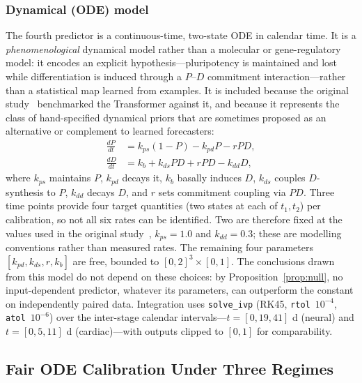 \documentclass[pdflatex,sn-mathphys-num]{sn-jnl}
\theoremstyle{thmstyleone}%
\theoremstyle{thmstyletwo}%
\theoremstyle{thmstylethree}%
\begin{document}
\subsubsection{Dynamical (ODE) model} The fourth predictor is a continuous-time, two-state ODE in calendar time. It is a \emph{phenomenological} dynamical model rather than a molecular or gene-regulatory model: it encodes an explicit hypothesis---pluripotency is maintained and lost while differentiation is induced through a $P$--$D$ commitment interaction---rather than a statistical map learned from examples. It is included because the original study~\cite{kanu2026transformer} benchmarked the Transformer against it, and because it represents the class of hand-specified dynamical priors that are sometimes proposed as an alternative or complement to learned forecasters:
\begin{align}
\frac{dP}{dt} &= k_{ps}(1-P) - k_{pd}P - rPD,
\label{eq:ode_p}\\
\frac{dD}{dt} &= k_b + k_{ds}PD + rPD - k_{dd}D,
\label{eq:ode_d}
\end{align}
where $k_{ps}$ maintains $P$, $k_{pd}$ decays it, $k_b$ basally induces $D$, $k_{ds}$ couples $D$-synthesis to $P$, $k_{dd}$ decays $D$, and $r$ sets commitment coupling via $PD$. Three time points provide four target quantities (two states at each of $t_1,t_2$) per calibration, so not all six rates can be identified. Two are therefore fixed at the values used in the original study~\cite{kanu2026transformer}, $k_{ps}{=}1.0$ and $k_{dd}{=}0.3$; these are modelling conventions rather than measured rates. The remaining four parameters $[k_{pd},k_{ds},r,k_b]$ are free, bounded to $[0,2]^3\times[0,1]$. The conclusions drawn from this model do not depend on these choices: by Proposition~\ref{prop:null}, no input-dependent predictor, whatever its parameters, can outperform the constant on independently paired data. Integration uses \texttt{solve\_ivp} (RK45, \texttt{rtol}~$10^{-4}$, \texttt{atol}~$10^{-6}$) over the inter-stage calendar intervals---$t=[0,19,41]$ d (neural) and $t=[0,5,11]$ d (cardiac)---with outputs clipped to $[0,1]$ for comparability.

\subsection{\textbf{Fair ODE Calibration Under Three Regimes}}
\label{subsec:ode_calib}
\end{document}
